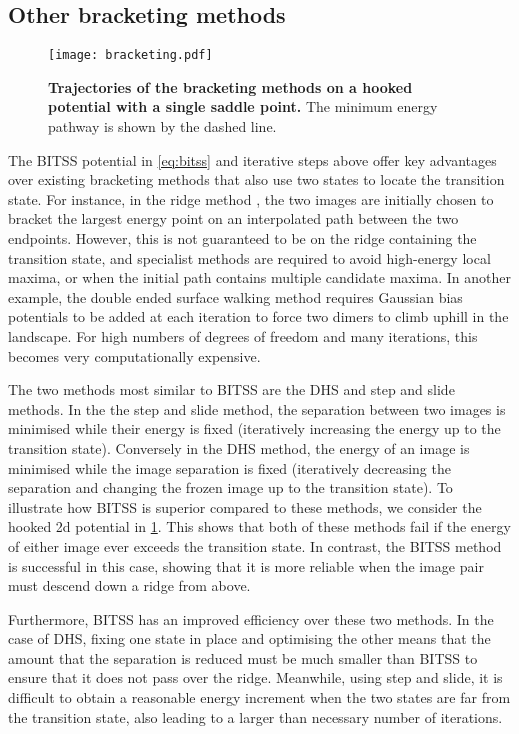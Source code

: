 \documentclass[twocolumn,10pt]{revtex4}
\begin{document}
\subsection{Other bracketing methods}
\begin{figure}[htb]
  \texttt{[image: bracketing.pdf]}
  \caption{\label{fig:bracketing}
    \textbf{Trajectories of the bracketing methods on a hooked potential with a single saddle point.}
    The minimum energy pathway is shown by the dashed line.
  }
\end{figure}
The BITSS potential in \cref{eq:bitss} and iterative steps above offer key advantages over existing bracketing methods that also use two states to locate the transition state.
For instance, in the ridge method \cite{Ionova1993}, the two images are initially chosen to bracket the largest energy point on an interpolated path between the two endpoints.
However, this is not guaranteed to be on the ridge containing the transition state, and specialist methods are required to avoid high-energy local maxima, or when the initial path contains multiple candidate maxima.
In another example, the double ended surface walking method \cite{Zhang2013} requires Gaussian bias potentials to be added at each iteration to force two dimers to climb uphill in the landscape.
For high numbers of degrees of freedom and many iterations, this becomes very computationally expensive.

The two methods most similar to BITSS are the DHS and step and slide methods.
In the the step and slide method, the separation between two images is minimised while their energy is fixed (iteratively increasing the energy up to the transition state).
Conversely in the DHS method, the energy of an image is minimised while the image separation is fixed (iteratively decreasing the separation and changing the frozen image up to the transition state).
To illustrate how BITSS is superior compared to these methods, we consider the hooked 2d potential in \cref{fig:bracketing}.
This shows that both of these methods fail if the energy of either image ever exceeds the transition state.
In contrast, the BITSS method is successful in this case, showing that it is more reliable when the image pair must descend down a ridge from above.

Furthermore, BITSS has an improved efficiency over these two methods.
In the case of DHS, fixing one state in place and optimising the other means that the amount that the separation is reduced must be much smaller than BITSS to ensure that it does not pass over the ridge.
Meanwhile, using step and slide, it is difficult to obtain a reasonable energy increment when the two states are far from the transition state, also leading to a larger than necessary number of iterations.
\end{document}
